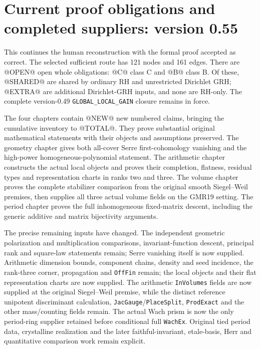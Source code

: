 \section{Current proof obligations and completed suppliers: version 0.55}
\label{sec:dependency-audit-v55}

This continues the human reconstruction with the formal proof accepted
as correct. The selected sufficient route has 121 nodes and 161 edges.
There are @OPEN@ open whole obligations: @C@ class C and @B@ class B.
Of these, @SHARED@ are shared by ordinary RH and unrestricted Dirichlet
GRH; @EXTRA@ are additional Dirichlet-GRH inputs, and none are RH-only.
The complete version-0.49 \texttt{GLOBAL\_LOCAL\_GAIN} closure remains
in force.

The four chapters contain @NEW@ new numbered claims, bringing the
cumulative inventory to @TOTAL@. They prove substantial original
mathematical statements with their objects and assumptions preserved.
The geometry chapter gives both all-cover Serre first-cohomology
vanishing and the high-power homogeneous-polynomial statement.
The arithmetic chapter constructs the actual local objects and proves
their completion, flatness, residual types and representation charts
in ranks two and three. The volume chapter proves the complete
stabilizer comparison from the original smooth Siegel--Weil premises,
then supplies all three actual volume fields on the GMR19 setting.
The period chapter proves the full inhomogeneous fixed-matrix descent,
including the generic additive and matrix bijectivity arguments.

The precise remaining inputs have changed. The independent geometric
polarization and multiplication comparisons, invariant-function
descent, principal rank and square-law statements remain; Serre
vanishing itself is now supplied. Arithmetic dimension bounds,
component chains, density and seed incidence, the rank-three corner,
propagation and \texttt{OffFin} remain; the local objects and their
flat representation charts are now supplied. The arithmetic
\texttt{InVolumes} fields are now supplied at the original
Siegel--Weil premise, while the distinct reference unipotent
discriminant calculation, \texttt{JacGauge}/\texttt{PlaceSplit},
\texttt{ProdExact} and the other mass/counting fields remain.
The actual Wach prism is now the only period-ring supplier retained
before conditional full \texttt{WachEx}. Original tied period data,
crystalline realization and the later faithful-invariant, etale-basis,
Herr and quantitative comparison work remain explicit.

